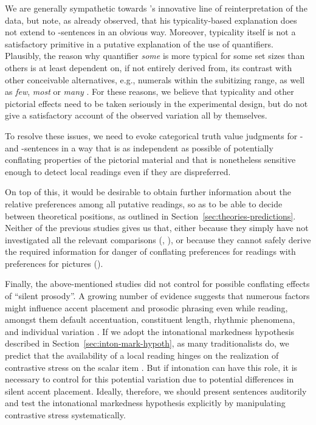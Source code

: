 \documentclass[fleqn,reqno,10pt,draft]{article}
\newcommand{\as}{\acro{as}}
\renewcommand{\es}{\acro{es}}
\begin{document}
We are generally sympathetic towards
\citeauthor{Tielvan-Tiel2012:Embedded-Scalar}'s innovative line of
reinterpretation of the data, but note, as
\citet{ChemlaSpector2010:Experimental-Ev} already observed, that his
typicality-based explanation does not extend to \es-sentences in an
obvious way. Moreover, typicality itself is not a satisfactory
primitive in a putative explanation of the use of
quantifiers. Plausibly, the reason why quantifier \emph{some} is more
typical for some set sizes than others is at least dependent on, if
not entirely derived from, its contrast with other conceivable
alternatives, e.g., numerals within the subitizing range, as well as
\emph{few}, \emph{most} or \emph{many}
\citep[c.f.][]{DegenTanenhaus2012:Processing-Scal}. For these reasons,
we believe that typicality and other pictorial effects need to be
taken seriously in the experimental design, but do not give a
satisfactory account of the observed variation all by themselves.

To resolve these issues, we need to evoke categorical truth value judgments
for \as- and \es-sentences in a way that is as independent as
possible of potentially conflating properties of the pictorial
material and that is nonetheless sensitive enough to detect local
readings even if they are dispreferred.

On top of this, it would be desirable to obtain further information
about the relative preferences among all putative readings, so as to
be able to decide between theoretical positions, as outlined in
Section~\ref{sec:theories-predictions}. Neither of the previous
studies gives us that, either because they simply have not
investigated all the relevant comparisons
(\citet{GeurtsPouscoulous2009:Embedded-Implic},
\citet{CliftonDube2010:Embedded-Implic}), or because they cannot
safely derive the required information for danger of conflating
preferences for readings with preferences for pictures
(\citet{ChemlaSpector2010:Experimental-Ev}).

Finally, the above-mentioned studies did not control for possible
conflating effects of ``silent prosody''. A growing number of evidence
suggests that numerous factors might influence accent placement and
prosodic phrasing even while reading, amongst them default
accentuation, constituent length, rhythmic phenomena, and individual
variation \citep[e.g.][]{Augurzky08,Bader98,Fodor98,Fodor02,Kentner12,
  Steinhauer01}. If we adopt the intonational markedness hypothesis
described in Section~\ref{sec:inton-mark-hypoth}, as many
traditionalists do, we predict that the availability of a local
reading hinges on the realization of contrastive stress on the scalar
item
\citep[e.g.][]{Horn2006:The-Border-Wars,Geurts2009:Scalar-Implicat,Geurts2010:Quantity-Implic,Tielvan-Tiel2012:Embedded-Scalar,GeurtsTielvan-Tiel2013:Scalar-expressi}.
But if intonation can have this role, it is necessary to control for
this potential variation due to potential differences in silent accent
placement. Ideally, therefore, we should present sentences auditorily
and test the intonational markedness hypothesis explicitly by
manipulating contrastive stress systematically.
\end{document}
